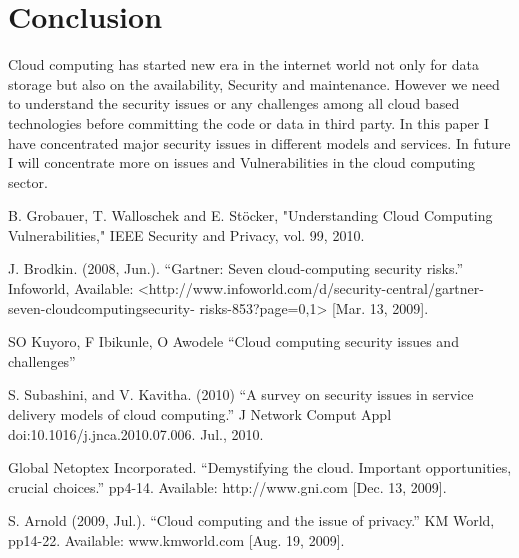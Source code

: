 \documentclass[conference]{IEEEtran}
\begin{document}
\section{Conclusion}
Cloud computing has started new era in the internet world not only for data storage but also on the availability, Security and maintenance. However we need to understand the security issues or any challenges among all cloud based technologies before committing the code or data in third party. In this paper I have concentrated major security issues in different models and services. In future I will concentrate more on issues and Vulnerabilities in the cloud computing sector. 

\begin{thebibliography}{00}
 B. Grobauer, T. Walloschek and E. Stöcker, "Understanding Cloud Computing
Vulnerabilities," IEEE Security and Privacy, vol. 99, 2010.


 J. Brodkin. (2008, Jun.). “Gartner: Seven cloud-computing security risks.” Infoworld,
Available: <http://www.infoworld.com/d/security-central/gartner-seven-cloudcomputingsecurity-
risks-853?page=0,1> [Mar. 13, 2009].


 SO Kuyoro, F Ibikunle, O Awodele  “Cloud computing security issues and challenges”

 S. Subashini, and V. Kavitha. (2010) “A survey on security issues in service delivery
models of cloud computing.” J Network Comput Appl doi:10.1016/j.jnca.2010.07.006. Jul.,
2010.

 Global Netoptex Incorporated. “Demystifying the cloud. Important opportunities, crucial
choices.” pp4-14. Available: http://www.gni.com [Dec. 13, 2009].

 S. Arnold (2009, Jul.). “Cloud computing and the issue of privacy.” KM World, pp14-22.
Available: www.kmworld.com [Aug. 19, 2009].

\end{thebibliography}
\end{document}
